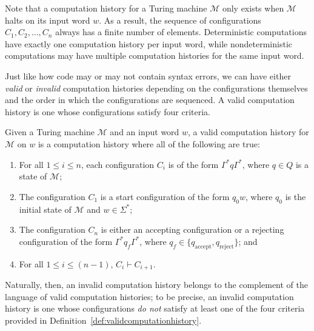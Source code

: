 Note that a computation history for a Turing machine $\mathcal{M}$ only exists when $\mathcal{M}$ halts on its input word $w$. As a result, the sequence of configurations $C_{1}, C_{2}, \dots, C_{n}$ always has a finite number of elements. Deterministic computations have exactly one computation history per input word, while nondeterministic computations may have multiple computation histories for the same input word.

Just like how code may or may not contain syntax errors, we can have either \emph{valid} or \emph{invalid} computation histories depending on the configurations themselves and the order in which the configurations are sequenced. A valid computation history is one whose configurations satisfy four criteria.

\begin{definition}\label{def:validcomputationhistory}
Given a Turing machine $\mathcal{M}$ and an input word $w$, a valid computation history for $\mathcal{M}$ on $w$ is a computation history where all of the following are true:
\begin{enumerate}
\item For all $1 \leq i \leq n$, each configuration $C_{i}$ is of the form $\Gamma^{*} q \Gamma^{*}$, where $q \in Q$ is a state of $\mathcal{M}$;
\item The configuration $C_{1}$ is a start configuration of the form $q_{0} w$, where $q_{0}$ is the initial state of $\mathcal{M}$ and $w \in \Sigma^{*}$;
\item The configuration $C_{n}$ is either an accepting configuration or a rejecting configuration of the form $\Gamma^{*} q_{f} \Gamma^{*}$, where $q_{f} \in \{q_{\text{accept}}, q_{\text{reject}}\}$; and
\item For all $1 \leq i \leq (n-1)$, $C_{i} \vdash C_{i+1}$.
\end{enumerate}
\end{definition}

Naturally, then, an invalid computation history belongs to the complement of the language of valid computation histories; to be precise, an invalid computation history is one whose configurations \emph{do not} satisfy at least one of the four criteria provided in Definition~\ref{def:validcomputationhistory}.

